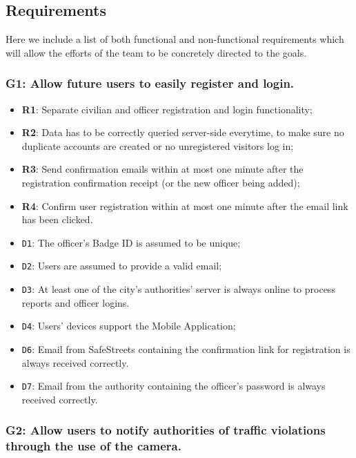 \documentclass[12pt,a4paper]{article}
\begin{document}
\subsection{Requirements}
Here we include a list of both functional and non-functional requirements which will allow the efforts of the team to be concretely directed to the goals.
\subsubsection{G1: Allow future users to easily register and login.}
	
	\begin{itemize}
			\item \textbf{R1}: Separate civilian and officer registration and login functionality;
			\item \textbf{R2}: Data has to be correctly queried server-side everytime, to make sure no duplicate accounts are created or no unregistered visitors log in;
			\item \textbf{R3}: Send confirmation emails within at most one minute after the registration confirmation receipt (or the new officer being added); 
			\item \textbf{R4}: Confirm user registration within at most one minute after the email link has been clicked.
	\end{itemize}
	
	\begin{itemize}
			\item \texttt{D1}: The officer's Badge ID is assumed to be unique;
			\item \texttt{D2}: Users are assumed to provide a valid email;
			\item \texttt{D3}: At least one of the city's authorities' server is always online to process reports and officer logins.
			\item \texttt{D4}: Users' devices support the Mobile Application;
			\item \texttt{D6}: Email from SafeStreets containing the confirmation link for registration is always received correctly.
			\item \texttt{D7}: Email from the authority containing the officer's password is always received correctly.
	\end{itemize}

\subsubsection{G2: Allow users to notify authorities of traffic violations through the use of the camera.}
	
\end{document}
